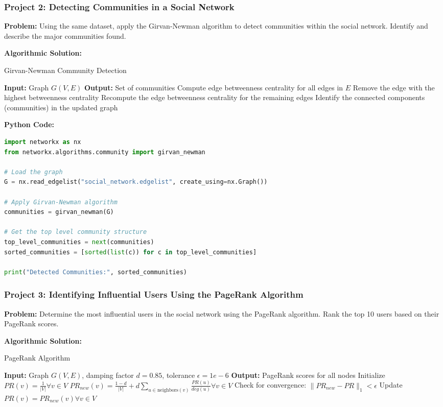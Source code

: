 \documentclass[12pt]{book} %
\begin{document}
\subsubsection*{Project 2: Detecting Communities in a Social Network}
\textbf{Problem:} Using the same dataset, apply the Girvan-Newman algorithm to detect communities within the social network. Identify and describe the major communities found.

\textbf{Algorithmic Solution:}
\begin{algorithm}
\caption{Girvan-Newman Community Detection}
\begin{algorithmic}
\State \textbf{Input:} Graph $G(V, E)$
\State \textbf{Output:} Set of communities
\State Compute edge betweenness centrality for all edges in $E$
    \State Remove the edge with the highest betweenness centrality
    \State Recompute the edge betweenness centrality for the remaining edges
    \State Identify the connected components (communities) in the updated graph
\EndWhile
\end{algorithmic}
\end{algorithm}

\FloatBarrier
\textbf{Python Code:}
\begin{lstlisting}[language=Python]
import networkx as nx
from networkx.algorithms.community import girvan_newman

# Load the graph
G = nx.read_edgelist("social_network.edgelist", create_using=nx.Graph())

# Apply Girvan-Newman algorithm
communities = girvan_newman(G)

# Get the top level community structure
top_level_communities = next(communities)
sorted_communities = [sorted(list(c)) for c in top_level_communities]

print("Detected Communities:", sorted_communities)
\end{lstlisting}
\FloatBarrier

\subsubsection*{Project 3: Identifying Influential Users Using the PageRank Algorithm}
\textbf{Problem:} Determine the most influential users in the social network using the PageRank algorithm. Rank the top 10 users based on their PageRank scores.

\textbf{Algorithmic Solution:}
\begin{algorithm}
\caption{PageRank Algorithm}
\begin{algorithmic}
\State \textbf{Input:} Graph $G(V, E)$, damping factor $d = 0.85$, tolerance $\epsilon = 1e-6$
\State \textbf{Output:} PageRank scores for all nodes
\State Initialize $PR(v) = \frac{1}{|V|} \forall v \in V$
\Repeat
    \State $PR_{new}(v) = \frac{1-d}{|V|} + d \sum_{u \in \text{neighbors}(v)} \frac{PR(u)}{deg(u)} \forall v \in V$
    \State Check for convergence: $\|PR_{new} - PR\|_1 < \epsilon$
    \State Update $PR(v) = PR_{new}(v) \forall v \in V$
\end{algorithmic}
\end{algorithm}
\end{document}
